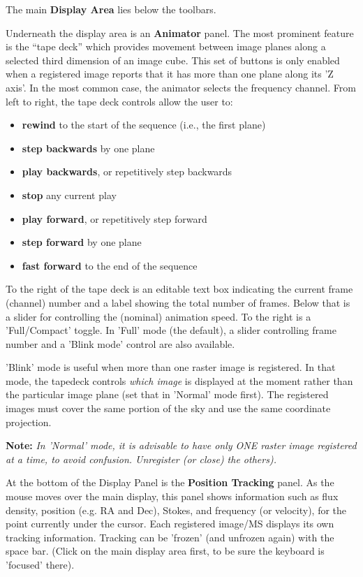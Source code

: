 The main {\bf Display Area} lies below the toolbars.

Underneath the display area is an {\bf Animator} panel.  The most prominent
feature is the ``tape deck'' which provides movement between image planes
along a selected third dimension of an image cube. This set of buttons is
only enabled when a registered image reports that it has more than one plane
along its 'Z axis'. In the most common case, the animator selects the frequency
channel. From left to right, the tape deck controls allow the user to:
\begin{itemize}
   \item {\bf rewind} to the start of the sequence (i.e., the first plane)
   \item {\bf step backwards} by one plane
   \item {\bf play backwards}, or repetitively step backwards
   \item {\bf stop} any current play
   \item {\bf play forward}, or repetitively step forward
   \item {\bf step forward} by one plane
   \item {\bf fast forward} to the end of the sequence
\end{itemize}
To the right of the tape deck is an editable text box indicating the
current frame (channel) number and a label showing the total number of
frames. Below that is a slider for controlling the (nominal) animation
speed. To the right is a 'Full/Compact' toggle. In 'Full' mode (the
default), a slider controlling frame number and a 'Blink mode' control
are also available.

'Blink' mode is useful when more than one raster image is
registered. In that mode, the tapedeck controls {\it which image} is
displayed at the moment rather than the particular image plane
(set that in 'Normal' mode first). The registered images must cover the
same portion of the sky and use the same coordinate projection.

{\bf Note:} {\em In 'Normal' mode, it is advisable to have only ONE
raster image registered at a time, to avoid confusion. Unregister (or
close) the others).}

At the bottom of the Display Panel is the {\bf Position Tracking} panel.  As
the mouse moves over the main display, this panel shows information such as
flux density, position (e.g. RA and Dec), Stokes, and frequency (or velocity),
for the point currently under the cursor.  Each registered image/MS displays
its own tracking information.  Tracking can be 'frozen' (and unfrozen again)
with the space bar.  (Click on the main display area first, to be sure the
keyboard is 'focused' there).

